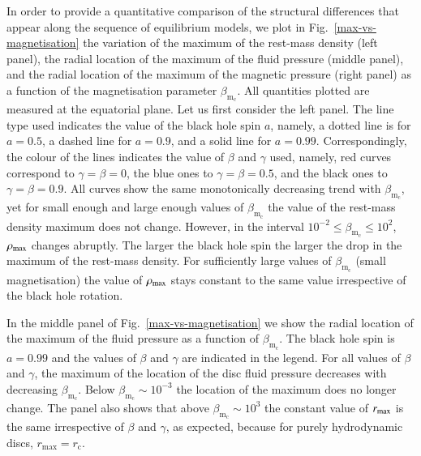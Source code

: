 \documentclass{aa}
\begin{document}
In order to provide a quantitative comparison of the structural differences that appear along the sequence of equilibrium models, we plot in Fig.~\ref{max-vs-magnetisation} the variation of the maximum of the rest-mass density (left panel), the radial location of the maximum of the fluid pressure (middle panel), and the radial location of the maximum of the magnetic pressure (right panel) as a function of the magnetisation parameter $\beta_{\mathrm{m}_{\mathrm{c}}}$. All quantities plotted are measured at the equatorial plane. Let us first consider the left panel. The line type used indicates the value of the black hole spin $a$, namely, a dotted line is for $a=0.5$, a dashed line for $a=0.9$, and a solid line for $a=0.99$. Correspondingly, the colour of the lines indicates the value of $\beta$ and $\gamma$ used, namely, red curves correspond to $\gamma=\beta=0$, the blue ones to $\gamma=\beta=0.5$, and the black ones to $\gamma=\beta=0.9$. All curves show the same monotonically decreasing trend with $\beta_{\mathrm{m}_{\mathrm{c}}}$, yet for small enough and large enough values of $\beta_{\mathrm{m}_{\mathrm{c}}} $ the value of the rest-mass density maximum does not change. However, in the interval $10^{-2}\le \beta_{\mathrm{m}_{\mathrm{c}}} \le 10^{2}$, $\rho_{\rm max}$ changes abruptly. The larger the black hole spin the larger the drop in the maximum of the rest-mass density. For sufficiently large values of $\beta_{\mathrm{m}_{\mathrm{c}}}$ (small magnetisation) the value of $\rho_{\rm max}$ stays constant to the same value irrespective of the black hole rotation.

In the middle panel of Fig.~\ref{max-vs-magnetisation} we show the radial location of the maximum of the fluid pressure as a function of $\beta_{\mathrm{m}_{\mathrm{c}}}$. The black hole spin is $a=0.99$ and the values of $\beta$ and $\gamma$ are indicated in the legend. For all values of $\beta$ and $\gamma$, the maximum of the location of the disc fluid pressure decreases with decreasing $\beta_{\mathrm{m}_{\mathrm{c}}}$. Below $\beta_{\mathrm{m}_{\mathrm{c}}}\sim 10^{-3}$ the location of the maximum does no longer change. The panel also shows that above $\beta_{\mathrm{m}_{\mathrm{c}}}\sim 10^{3}$ the constant value of $r_{\rm max}$ is the same irrespective of $\beta$ and $\gamma$, as expected, because for purely hydrodynamic discs, $r_{\mathrm{max}} = r_{\mathrm{c}}$.
\end{document}
